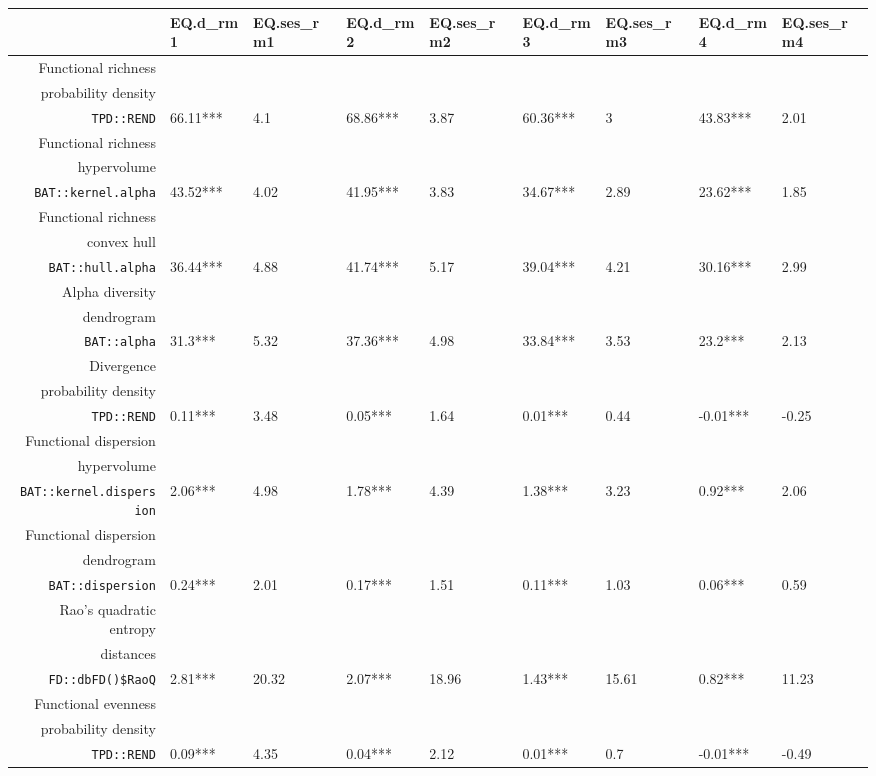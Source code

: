 \begin{table}[ht]
\centering
\scriptsize
\begin{tabular}{rllllllll}
  \hline
 & EQ.d\_rm1 & EQ.ses\_rm1 & EQ.d\_rm2 & EQ.ses\_rm2 & EQ.d\_rm3 & EQ.ses\_rm3 & EQ.d\_rm4 & EQ.ses\_rm4 \\ 
  \hline
Functional richness\\ probability density\\ \texttt{TPD::REND} & 66.11*** & 4.1 & 68.86*** & 3.87 & 60.36*** & 3 & 43.83*** & 2.01 \\ 
  Functional richness\\ hypervolume\\ \texttt{BAT::kernel.alpha} & 43.52*** & 4.02 & 41.95*** & 3.83 & 34.67*** & 2.89 & 23.62*** & 1.85 \\ 
  Functional richness\\ convex hull\\ \texttt{BAT::hull.alpha} & 36.44*** & 4.88 & 41.74*** & 5.17 & 39.04*** & 4.21 & 30.16*** & 2.99 \\ 
  Alpha diversity\\ dendrogram\\ \texttt{BAT::alpha} & 31.3*** & 5.32 & 37.36*** & 4.98 & 33.84*** & 3.53 & 23.2*** & 2.13 \\ 
  Divergence\\ probability density\\ \texttt{TPD::REND} & 0.11*** & 3.48 & 0.05*** & 1.64 & 0.01*** & 0.44 & -0.01*** & -0.25 \\ 
  Functional dispersion\\ hypervolume\\ \texttt{BAT::kernel.dispersion} & 2.06*** & 4.98 & 1.78*** & 4.39 & 1.38*** & 3.23 & 0.92*** & 2.06 \\ 
  Functional dispersion\\ dendrogram\\ \texttt{BAT::dispersion} & 0.24*** & 2.01 & 0.17*** & 1.51 & 0.11*** & 1.03 & 0.06*** & 0.59 \\ 
  Rao's quadratic entropy\\ distances\\ \texttt{FD::dbFD()\$RaoQ} & 2.81*** & 20.32 & 2.07*** & 18.96 & 1.43*** & 15.61 & 0.82*** & 11.23 \\ 
  Functional evenness\\ probability density\\ \texttt{TPD::REND} & 0.09*** & 4.35 & 0.04*** & 2.12 & 0.01*** & 0.7 & -0.01*** & -0.49 \\ 

\end{tabular}
\end{table}
